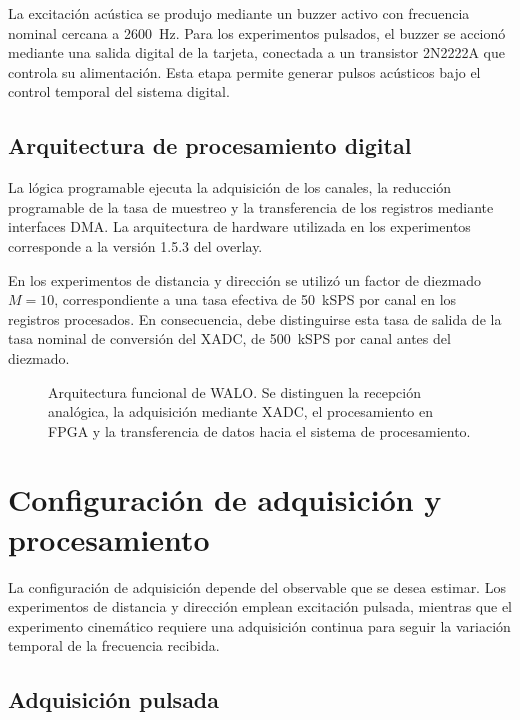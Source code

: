 La excitación acústica se produjo mediante un buzzer activo
con frecuencia nominal cercana a \SI{2600}{\hertz}. Para los
experimentos pulsados, el buzzer se accionó mediante una salida
digital de la tarjeta, conectada a un transistor 2N2222A que
controla su alimentación. Esta etapa permite generar pulsos
acústicos bajo el control temporal del sistema digital.

\subsection{Arquitectura de procesamiento digital}

La lógica programable ejecuta la adquisición de los canales,
la reducción programable de la tasa de muestreo y la transferencia
de los registros mediante interfaces DMA. La arquitectura de
hardware utilizada en los experimentos corresponde a la versión
1.5.3 del overlay.

En los experimentos de distancia y dirección se utilizó un
factor de diezmado $M=10$, correspondiente a una tasa efectiva
de \SI{50}{kSPS} por canal en los registros procesados. En
consecuencia, debe distinguirse esta tasa de salida de la tasa
nominal de conversión del XADC, de \SI{500}{kSPS} por canal
antes del diezmado.

\begin{figure}[!htbp]
    \centering
    
    \caption{Arquitectura funcional de WALO. Se distinguen la
    recepción analógica, la adquisición mediante XADC, el
    procesamiento en FPGA y la transferencia de datos hacia
    el sistema de procesamiento.}
    \label{fig:arquitectura_walo}
\end{figure}

\section{Configuración de adquisición y procesamiento}
\label{sec:configuracion_adquisicion}

La configuración de adquisición depende del observable que se
desea estimar. Los experimentos de distancia y dirección emplean
excitación pulsada, mientras que el experimento cinemático requiere
una adquisición continua para seguir la variación temporal de
la frecuencia recibida.

\subsection{Adquisición pulsada}

